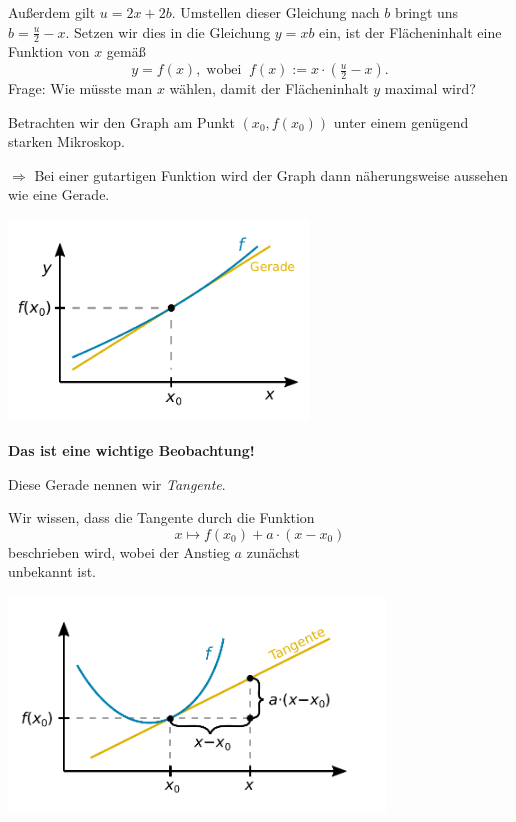 \documentclass{beamer}
\newcommand{\strong}[1]{\textsf{\textbf{#1}}}
\begin{document}
\begin{frame}
Außerdem gilt $u=2x+2b$. Umstellen dieser Gleichung nach $b$ bringt
uns $b=\tfrac{u}{2}-x$.\pause{}
Setzen wir dies in die Gleichung $y=xb$ ein,
ist der Flächeninhalt eine Funktion von $x$ gemäß
\[y = f(x),\;\text{wobei}\;\; f(x) := x\cdot (\tfrac{u}{2}-x).\]
\pause
Frage: Wie müsste man $x$ wählen, damit der Flächeninhalt $y$
maximal wird? 
\end{frame}

\begin{frame}[t]
\vspace{1em}

Betrachten wir den Graph am Punkt $(x_0,f(x_0))$ unter einem
genügend starken Mikroskop.\pause

\vspace{0.5em}
$\Longrightarrow$ Bei einer gutartigen Funktion wird der Graph dann
näherungsweise aussehen wie eine Gerade.\pause

\vspace{-1em}
\begin{center}
\includegraphics[width=80mm]{img/Funktion-Tangente.pdf}
\end{center}
\end{frame}

\begin{frame}
\strong{Das ist eine wichtige Beobachtung!}\pause

\vspace{0.8em}
Diese Gerade nennen wir \emph{Tangente}.
\end{frame}

\begin{frame}[t]
\vspace{0.5em}
Wir wissen, dass die Tangente durch die Funktion
\[x\mapsto f(x_0)+a\cdot (x-x_0)\]
beschrieben wird, wobei der Anstieg $a$ zunächst\\
unbekannt ist.\pause

\vspace{-1em}
\begin{center}
\includegraphics[width=100mm]{img/Tangente.pdf}
\end{center}
\end{frame}
\end{document}

